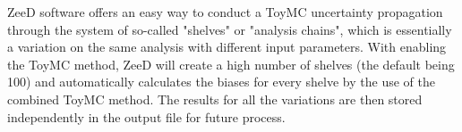 ZeeD software offers an easy way to conduct a ToyMC uncertainty propagation through the system of so-called "shelves" or "analysis chains", which is essentially a variation on the same analysis with different input parameters. With enabling the ToyMC method, ZeeD will create a high number of shelves (the default being 100) and automatically calculates the biases for every shelve by the use of the combined ToyMC method. The results for all the variations are then stored independently in the output file for future process.
